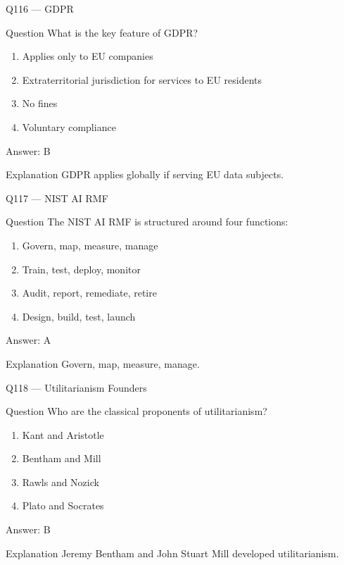 \documentclass[aspectratio=169,8pt]{beamer}
\begin{document}
	\begin{frame}{Q116 --- GDPR}
		\begin{block}{Question}
			What is the key feature of GDPR?
		\end{block}
		\begin{enumerate}
			\item Applies only to EU companies
			\item Extraterritorial jurisdiction for services to EU residents
			\item No fines
			\item Voluntary compliance
		\end{enumerate}
		\begin{exampleblock}{Answer: B}\end{exampleblock}
		\begin{block}{Explanation}
			GDPR applies globally if serving EU data subjects.
		\end{block}
	\end{frame}
	
	\begin{frame}{Q117 --- NIST AI RMF}
		\begin{block}{Question}
			The NIST AI RMF is structured around four functions:
		\end{block}
		\begin{enumerate}
			\item Govern, map, measure, manage
			\item Train, test, deploy, monitor
			\item Audit, report, remediate, retire
			\item Design, build, test, launch
		\end{enumerate}
		\begin{exampleblock}{Answer: A}\end{exampleblock}
		\begin{block}{Explanation}
			Govern, map, measure, manage.
		\end{block}
	\end{frame}
	
	\begin{frame}{Q118 --- Utilitarianism Founders}
		\begin{block}{Question}
			Who are the classical proponents of utilitarianism?
		\end{block}
		\begin{enumerate}
			\item Kant and Aristotle
			\item Bentham and Mill
			\item Rawls and Nozick
			\item Plato and Socrates
		\end{enumerate}
		\begin{exampleblock}{Answer: B}\end{exampleblock}
		\begin{block}{Explanation}
			Jeremy Bentham and John Stuart Mill developed utilitarianism.
		\end{block}
	\end{frame}
	
\end{document}
